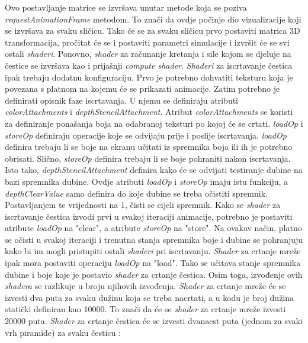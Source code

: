 \documentclass{foi}
\begin{document}
Ovo postavljanje matrice se izvršava unutar metode koja se poziva \textit{requestAnimationFrame} metodom. To znači da ovdje počinje dio vizualizacije koji se izvršava za svaku sličicu. Tako će se za svaku sličicu prvo postaviti matrica 3D transformacija, pročitat će se i postaviti parametri simulacije i izvršit će se svi ostali \textit{shaderi}. Ponovno, \textit{shader} za računanje kretanja i sile kojom se djeluje na čestice se izvršava kao i prijašnji \textit{compute shader}. \textit{Shaderi} za iscrtavanje čestica ipak trebaju dodatnu konfiguraciju. Prvo je potrebno dohvatiti teksturu koja je povezana s platnom na kojemu će se prikazati animacije. Zatim potrebno je definirati opisnik faze iscrtavanja. U njemu se definiraju atributi \textit{colorAttachments} i \textit{depthStencilAttachment}. Atribut \textit{colorAttachments} se koristi za definiranje ponašanja boja na odabranoj teksturi po kojoj će se crtati. \textit{loadOp} i \textit{storeOp} definiraju operacije koje se odvijaju prije i poslije iscrtavanja. \textit{loadOp} definira trebaju li se boje na ekranu učitati iz spremnika boja ili ih je potrebno obrisati. Slično, \textit{storeOp} definira trebaju li se boje pohraniti nakon iscrtavanja. Isto tako, \textit{depthStencilAttachment} definira kako će se odvijati testiranje dubine na bazi spremnika dubine. Ovdje atributi \textit{loadOp} i \textit{storeOp} imaju istu funkciju, a \textit{depthClearValue} samo definira do koje dubine se treba očistiti spremnik. Postavljanjem te vrijednosti na 1, čisti se cijeli spremnik. Kako se \textit{shader} za iscrtavanje čestica izvodi prvi u svakoj iteraciji animacije, potrebno je postaviti atribute \textit{loadOp} na "clear", a atribute \textit{storeOp} na "store". Na ovakav način, platno se očisti u svakoj iteraciji i trenutna stanja spremnika boje i dubine se pohranjuju kako bi im mogli pristupiti ostali \textit{shaderi} pri iscrtavanju. \textit{Shader} za crtanje mreže ipak mora postaviti operaciju \textit{loadOp} na "load". Tako se učitava stanje spremnika dubine i boje koje je postavio \textit{shader} za crtanje čestica. Osim toga, izvođenje ovih \textit{shadera} se razlikuje u broju njihovih izvođenja. \textit{Shader} za crtanje mreže će se izvesti dva puta za svaku dužinu koja se treba nacrtati, a u kodu je broj dužina statički definiran kao 10000. To znači da će se \textit{shader} za crtanje mreže izvesti 20000 puta. \textit{Shader} za crtanje čestica će se izvesti dvanaest puta (jednom za svaki vrh piramide) za svaku česticu \parencite{ItCGWebGPU3D}:
\end{document}
